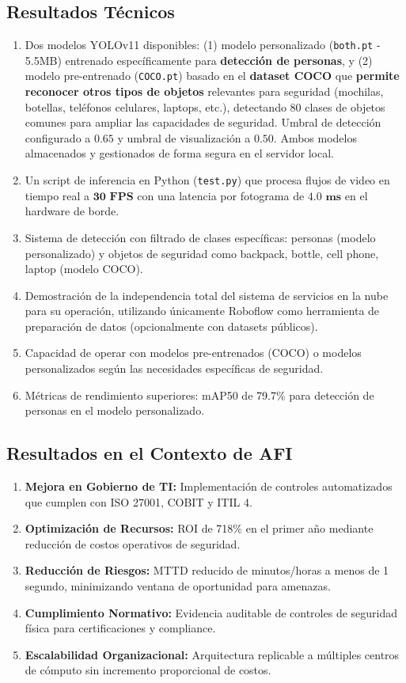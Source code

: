 \documentclass[12pt, a4paper]{article}
\begin{document}
\begin{itemize}
\subsection{Resultados Técnicos}
\begin{enumerate}
\item Dos modelos YOLOv11 disponibles: (1) modelo personalizado (\texttt{both.pt} - 5.5MB) entrenado específicamente para \textbf{detección de personas}, y (2) modelo pre-entrenado (\texttt{COCO.pt}) basado en el \textbf{dataset COCO} que \textbf{permite reconocer otros tipos de objetos} relevantes para seguridad (mochilas, botellas, teléfonos celulares, laptops, etc.), detectando 80 clases de objetos comunes para ampliar las capacidades de seguridad. Umbral de detección configurado a $\mathbf{0.65}$ y umbral de visualización a $\mathbf{0.50}$. Ambos modelos almacenados y gestionados de forma segura en el servidor local.
\item Un script de inferencia en Python (\texttt{test.py}) que procesa flujos de video en tiempo real a $\mathbf{30 \text{ FPS}}$ con una latencia por fotograma de $\mathbf{4.0 \text{ ms}}$ en el hardware de borde.
\item Sistema de detección con filtrado de clases específicas: personas (modelo personalizado) y objetos de seguridad como backpack, bottle, cell phone, laptop (modelo COCO).
\item Demostración de la independencia total del sistema de servicios en la nube para su operación, utilizando únicamente Roboflow como herramienta de preparación de datos (opcionalmente con datasets públicos).
\item Capacidad de operar con modelos pre-entrenados (COCO) o modelos personalizados según las necesidades específicas de seguridad.
\item Métricas de rendimiento superiores: mAP50 de 79.7\% para detección de personas en el modelo personalizado.
\end{enumerate}

\subsection{Resultados en el Contexto de AFI}
\begin{enumerate}
\item \textbf{Mejora en Gobierno de TI:} Implementación de controles automatizados que cumplen con ISO 27001, COBIT y ITIL 4.
\item \textbf{Optimización de Recursos:} ROI de 718\% en el primer año mediante reducción de costos operativos de seguridad.
\item \textbf{Reducción de Riesgos:} MTTD reducido de minutos/horas a menos de 1 segundo, minimizando ventana de oportunidad para amenazas.
\item \textbf{Cumplimiento Normativo:} Evidencia auditable de controles de seguridad física para certificaciones y compliance.
\item \textbf{Escalabilidad Organizacional:} Arquitectura replicable a múltiples centros de cómputo sin incremento proporcional de costos.
\end{enumerate}


\end{itemize}
\end{document}
